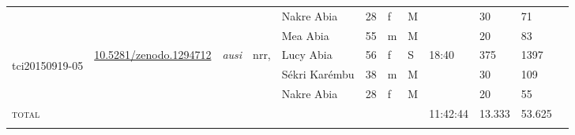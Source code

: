 \begin{landscape}
{\begin{longtable}{p{}lllllllllll}
	&&&& Nakre Abia & 28 & f & M & & 30&71\\
	&&&& Mea Abia & 55 & m & M && 20&83\\\hline
	\multirow{3}{*}{\hypertarget{tci20150919-05}{tci20150919-05}} &\multirow{3}{*}{\href{https://zenodo.org/record/1294712}{10.5281/zenodo.1294712}}& \multirow{3}{*}{\emph{ausi}} & \multirow{2}{*}{nrr,} & Lucy Abia & 56 & f & S &\multirow{3}{*}{18:40}& 375&1397\\
	&&&\multirow{2}{*}{cvr}& Sékri Karémbu & 38 & m & M && 30&109\\
	&&&& Nakre Abia & 28 & f & M & & 20&55\\\hline
	\textsc{total}&&&&&&&&11:42:44&13.333&53.625\\
	\lspbottomrule
\end{longtable}}%
\end{landscape}